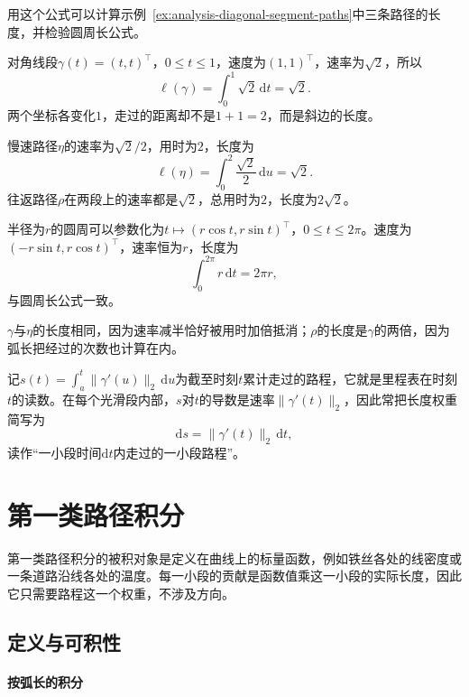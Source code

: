 用这个公式可以计算示例~\ref{ex:analysis-diagonal-segment-paths}中三条路径的长度，并检验圆周长公式。
\begin{example}[对角线段与圆周的弧长]
对角线段$\gamma(t)=(t,t)^\top$，$0\leq t\leq1$，速度为$(1,1)^\top$，速率为$\sqrt2$，所以
\[
 \ell(\gamma)=\int_0^1\sqrt2\,\mathrm dt=\sqrt2 .
\]
两个坐标各变化$1$，走过的距离却不是$1+1=2$，而是斜边的长度。

慢速路径$\eta$的速率为$\sqrt2/2$，用时为$2$，长度为
\[
 \ell(\eta)=\int_0^2\frac{\sqrt2}2\,\mathrm du=\sqrt2 .
\]
往返路径$\rho$在两段上的速率都是$\sqrt2$，总用时为$2$，长度为$2\sqrt2$。

半径为$r$的圆周可以参数化为$t\mapsto(r\cos t,r\sin t)^\top$，$0\leq t\leq2\pi$。速度为$(-r\sin t,r\cos t)^\top$，速率恒为$r$，长度为
\[
 \int_0^{2\pi}r\,\mathrm dt=2\pi r ,
\]
与圆周长公式一致。
\end{example}

$\gamma$与$\eta$的长度相同，因为速率减半恰好被用时加倍抵消；$\rho$的长度是$\gamma$的两倍，因为弧长把经过的次数也计算在内。

记$s(t)=\int_a^t\lVert\gamma'(u)\rVert_2\,\mathrm du$为截至时刻$t$累计走过的路程，它就是里程表在时刻$t$的读数。在每个光滑段内部，$s$对$t$的导数是速率$\lVert\gamma'(t)\rVert_2$，因此常把长度权重简写为
\[
 \mathrm ds=\lVert\gamma'(t)\rVert_2\,\mathrm dt ,
\]
读作“一小段时间$\mathrm dt$内走过的一小段路程”。

\section{第一类路径积分}

第一类路径积分的被积对象是定义在曲线上的标量函数，例如铁丝各处的线密度或一条道路沿线各处的温度。每一小段的贡献是函数值乘这一小段的实际长度，因此它只需要路程这一个权重，不涉及方向。

\subsection{定义与可积性}

\paragraph{按弧长的积分}


